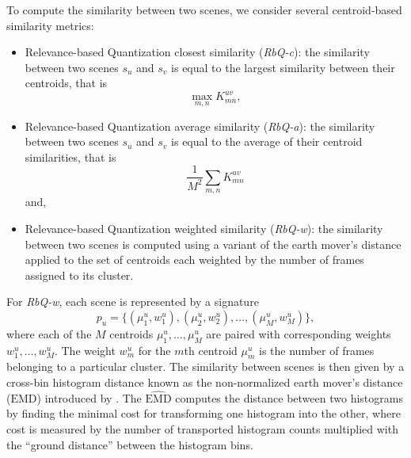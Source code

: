 \documentclass[smallextended]{svjour3}
\newcommand*{\EMD}{\mathrm{EMD}}
\newcommand{\ml}[1]{\textcolor{blue}{ Mathieu : #1}}
\begin{document}
To compute the similarity between two scenes, we consider several centroid-based similarity metrics:
\begin{itemize}
\item Relevance-based Quantization closest similarity (\emph{RbQ-c}): the similarity between two scenes $s_u$ and $s_v$ is equal to the largest similarity between their centroids, that is
\begin{equation}
	\max_{m,n} K_{mn}^{uv},
\end{equation}
\item Relevance-based Quantization average similarity  (\emph{RbQ-a}): the similarity between two scenes $s_u$ and $s_v$ is equal to the average of their centroid similarities, that is
\begin{equation}
	\frac{1}{M^2} \sum_{m,n} K_{mn}^{uv}
\end{equation}
and,
\item Relevance-based Quantization weighted similarity  (\emph{RbQ-w}): the similarity between two scenes is computed using a variant of the earth mover's distance applied to the set of centroids each weighted by the number of frames assigned to its cluster.
\end{itemize}

For \emph{RbQ-w}, each scene is represented by a signature
$$
p_u = \lbrace(\mu_1^u,w_1^u),(\mu_2^u,w_2^u),\ldots,(\mu_M^u,w_M^u)\rbrace,
$$
where each of the $M$ centroids $\mu_1^u, \ldots, \mu_M^u$ are paired with corresponding weights $w_1^u, \ldots, w_M^u$. The weight $w_m^u$ for the $m$th centroid $\mu_m^u$ is the number of frames belonging to a particular cluster. The similarity between scenes is then given by a cross-bin histogram distance known as the non-normalized earth mover's distance ($\widehat{\EMD}$) introduced by \cite{pele2008linear}. The $\widehat{\EMD}$ computes the distance between two histograms by finding the minimal cost for transforming one histogram into the other, where cost is measured by the number of transported histogram counts multiplied with the ``ground distance'' between the histogram bins. %
\end{document}
